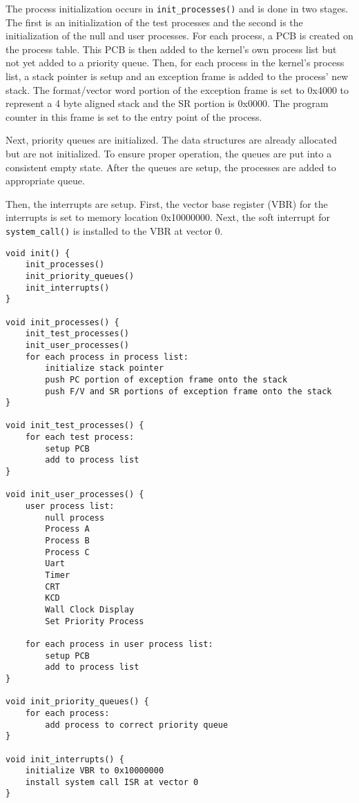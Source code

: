 \documentclass[oneside]{report}
\begin{document}
The process initialization occurs in \texttt{init\_processes()} and is done in
two stages. The first is an initialization of the test processes and the second
is the initialization of the null and user processes. For each process, a PCB
is created on the process table. This PCB is then added to the kernel's own
process list but not yet added to a priority queue. Then, for each process in
the kernel's process list, a stack pointer is setup and an exception frame is
added to the process' new stack. The format/vector word portion of the
exception frame is set to 0x4000 to represent a 4 byte aligned stack and the SR
portion is 0x0000. The program counter in this frame is set to the entry point
of the process.

Next, priority queues are initialized. The data structures are already
allocated but are not initialized. To ensure proper operation, the queues are
put into a consistent empty state. After the queues are setup, the processes
are added to appropriate queue.

Then, the interrupts are setup. First, the vector base register (VBR) for the
interrupts is set to memory location 0x10000000. Next, the soft interrupt for
\texttt{system\_call()} is installed to the VBR at vector 0.

\begin{lstlisting}
void init() {
    init_processes()
    init_priority_queues()
    init_interrupts()
}

void init_processes() {
    init_test_processes()
    init_user_processes()
    for each process in process list:
        initialize stack pointer
        push PC portion of exception frame onto the stack
        push F/V and SR portions of exception frame onto the stack
}

void init_test_processes() {
    for each test process: 
        setup PCB
        add to process list
}

void init_user_processes() {
    user process list:
        null process
        Process A
        Process B
        Process C
        Uart
        Timer
        CRT
        KCD
        Wall Clock Display
        Set Priority Process

    for each process in user process list:
        setup PCB
        add to process list
}

void init_priority_queues() {
    for each process: 
        add process to correct priority queue
}

void init_interrupts() {
    initialize VBR to 0x10000000
    install system call ISR at vector 0
}
\end{lstlisting}
\end{document}
